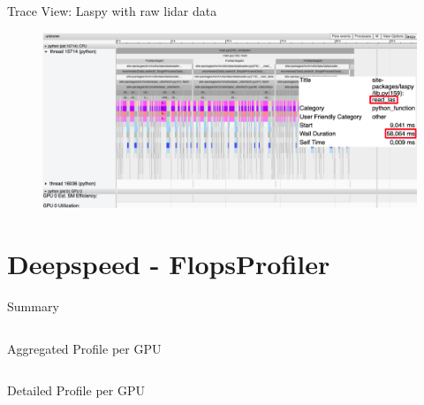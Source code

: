 \documentclass[compress,aspectratio=169]{beamer}
\begin{document}
\begin{frame}{Trace View: Laspy with raw lidar data}
    \vspace{-1em}
\begin{center}
    \begin{figure}
        \includegraphics[width=1\textwidth]{../../data/scap_gtx1080_profiler-torch_sample-points_14650750_trace-view-laspy}
    \end{figure}
    \end{center}
\end{frame}


\section{Deepspeed - FlopsProfiler}
\sectionIntro %

\begin{frame}[fragile]{Summary}
        \footnotesize\inputminted[xleftmargin=1em,linenos,fontsize=\scriptsize, firstline=1,lastline=16]{python}{../../data/scap_gtx1080_deepspeed_14615344_4294967294_one-epoch.txt}

\end{frame}

\begin{frame}[fragile]{Aggregated Profile per GPU}
        \footnotesize\inputminted[xleftmargin=1em,linenos,fontsize=\scriptsize, firstline=18,lastline=31]{python}{../../data/scap_gtx1080_deepspeed_14615344_4294967294_one-epoch.txt}

\end{frame}

\begin{frame}[fragile]{Detailed Profile per GPU}
        \footnotesize\inputminted[xleftmargin=1em,linenos,fontsize=\tiny, firstline=33,lastline=48, breaklines]{python}{../../data/scap_gtx1080_deepspeed_14615344_4294967294_one-epoch.txt}

\end{frame}
\end{document}
